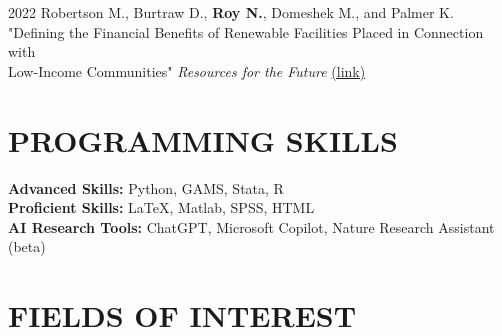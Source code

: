 \documentclass[margin]{res}
\begin{document}
\begin{resume}
2022 \hspace{4mm}%
    Robertson M., Burtraw D., \textbf{Roy N.}, Domeshek M., and Palmer K. \\ 
    \hspace*{16mm} "Defining the Financial Benefits of Renewable Facilities    
      Placed in Connection with \\ \hspace*{16mm} Low-Income Communities" \textit{Resources for the Future}
    \href{https://www.rff.org/publications/testimony-and-public-comments/defining-the-financial-benefits-of-renewable-facilities-placed-in-connection-with-low-income-communities} {(link)}


\section{PROGRAMMING SKILLS}
\textbf{Advanced Skills: \hspace*{5mm}} Python, GAMS, Stata, R \\
\textbf{Proficient Skills: \hspace*{5mm}} LaTeX, Matlab, SPSS, HTML \\
\textbf{AI Research Tools: \hspace*{1mm}} ChatGPT, Microsoft Copilot, Nature Research Assistant (beta) 

\section {FIELDS OF INTEREST}

\\


\end{resume}
\end{document}
